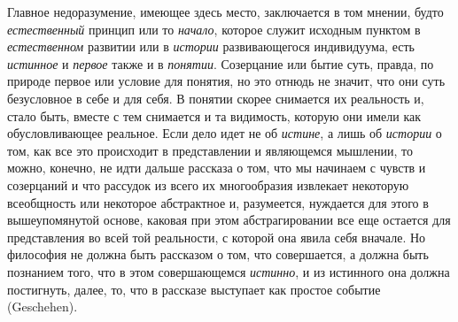 \documentclass[twoside]{article}
\begin{document}
{{Главное недоразумение, имеющее здесь место, заключается в том
мнении, будто {\em естественный}
принцип или то
{\em начало}, которое
служит исходным пунктом в
{\em естественном}
развитии или в
{\em истории}
развивающегося индивидуума, есть
{\em истинное} и
{\em первое} также и в
{\em понятии}. Созерцание
или бытие суть, правда, по природе первое или условие для понятия, но это
отнюдь не значит, что они суть безусловное в себе и для себя. В понятии
скорее снимается их реальность и, стало быть, вместе с тем снимается и та
видимость, которую они имели как обусловливающее реальное. Если дело идет
не об {\em истине}, а
лишь об {\em истории} о
том, как все это происходит в представлении и являющемся мышлении, то
можно, конечно, не идти дальше рассказа о том, что мы начинаем с чувств и
созерцаний и что рассудок из всего их многообразия извлекает некоторую
всеобщность или некоторое абстрактное и, разумеется, нуждается для этого в
вышеупомянутой основе, каковая при этом абстрагировании все еще остается
для представления во всей той реальности, с которой она явила себя вначале.
Но философия не должна быть рассказом о том, что совершается, а должна быть
познанием того, что в этом совершающемся
{\em истинно}, и из
истинного она должна постигнуть, далее, то, что в рассказе выступает как
простое событие (Geschehen).

}}
\end{document}
